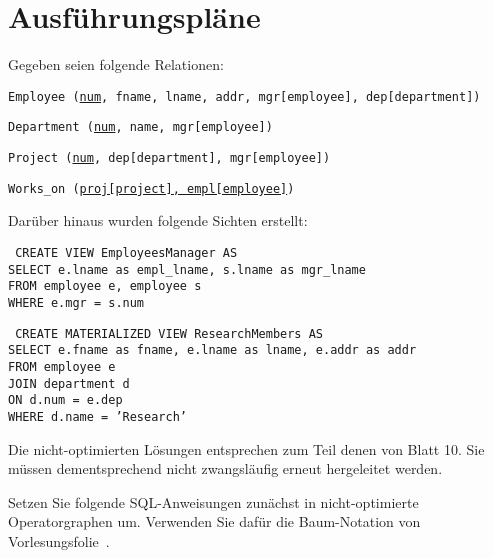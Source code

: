 \section{Ausführungspläne}

Gegeben seien folgende Relationen:

\texttt{Employee (\underline{num}, fname, lname, addr, mgr[employee],\beamertxt{\linebreak} dep[department])}

\texttt{Department (\underline{num}, name, mgr[employee])}

\texttt{Project (\underline{num}, dep[department], mgr[employee])}

\texttt{Works\_on (\underline{proj[project], empl[employee]})}

Darüber hinaus wurden folgende Sichten erstellt:

\texttt{
    CREATE VIEW EmployeesManager AS \\
    \hspace*{.3cm}  SELECT e.lname as empl\_lname, s.lname as mgr\_lname \\
    \hspace*{.3cm}  FROM employee e, employee s \\
    \hspace*{.3cm}  WHERE e.mgr = s.num
    }

\texttt{
    CREATE MATERIALIZED VIEW ResearchMembers AS \\
    \hspace*{.3cm}  SELECT e.fname as fname, e.lname as lname,\beamertxt{\linebreak\hspace*{.cm}} e.addr as addr \\
    \hspace*{.3cm}  FROM employee e \\
    \hspace*{.3cm}  JOIN department d \\
    \hspace*{.3cm}  ON d.num = e.dep \\
    \hspace*{.3cm}  WHERE d.name = 'Research'
    }

\begin{note}
Die nicht-optimierten Lösungen entsprechen zum Teil denen von Blatt 10.
Sie müssen dementsprechend nicht zwangsläufig erneut hergeleitet werden.
\end{note}

Setzen Sie folgende SQL-Anweisungen zunächst in nicht-optimierte Operatorgraphen um. Verwenden Sie dafür die Baum-Notation von Vorlesungsfolie~\Operatorgraph.

